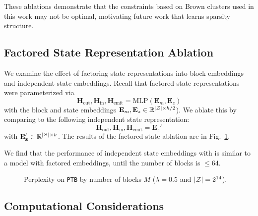 \documentclass[11pt,a4paper]{article}
\begin{document}
These ablations demonstrate that the constraints based on
Brown clusters used in this work may not be optimal,
motivating future work that learns sparsity structure.

\subsection{Factored State Representation Ablation}
We examine the effect of factoring state representations into block embeddings
and independent state embeddings.
Recall that factored state representations were parameterized via 
\[ \mathbf{H}_{\textrm{out}},\mathbf{H}_{\textrm{in}},\mathbf{H}_\textrm{emit}
 = \text{MLP}(\mathbf{E}_m, \mathbf{E}_z ) \] 
with the block and state embeddings 
$\mathbf{E}_m,\mathbf{E}_z \in \mathbb{R}^{|\mathcal{Z}| \times h/2}$).
We ablate this by comparing to the following independent state representation:
\[ \mathbf{H}_{\textrm{out}},\mathbf{H}_{\textrm{in}},\mathbf{H}_\textrm{emit}
 = \mathbf{E}_z' \] 
with $\mathbf{E_z'}\in\mathbb{R}^{|\mathcal{Z}| \times h}$.
The results of the factored state ablation are in Fig.~\ref{fig:fac-ablation},

We find that the performance of independent state embeddings with
is similar to a model with factored embeddings,
until the number of blocks is $\le 64$.

\begin{figure}[h]
\centering
{}
\caption{\label{fig:fac-ablation}
Perplexity on \texttt{PTB} by number of blocks $M$ ($\lambda =0.5$ and $|\mathcal{Z}|=2^{14}$).
}
\end{figure}

\subsection{Computational Considerations}
\end{document}
